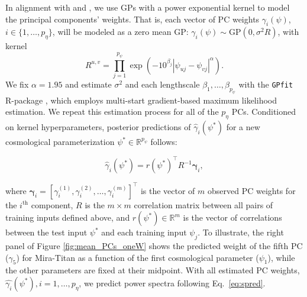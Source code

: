\documentclass[11pt]{article}
\begin{document}

In alignment with \cite{higdon2010estcosmo} and \cite{moran2023mira}, we use 
GPs with a power exponential kernel to model the principal components' weights. 
That is, each vector of PC weights $\gamma_i(\psi)$, $i \in \{1,\ldots,p_\eta\}$, 
will be modeled as a zero mean GP: $\gamma_i(\psi) \sim \mathrm{GP}(0, \sigma^2R)$, with kernel
\begin{equation*}
    R^{u,v} = \prod_{j=1}^{p_\psi}\exp\left(-10^{\beta_j}|\psi_{uj}-\psi_{vj}|^\alpha\right).
\end{equation*}
We fix $\alpha=1.95$ and estimate $\sigma^2$ and each lengthscale $\beta_1,\ldots,\beta_{p_\psi}$ 
with the \texttt{GPfit} {\sf R}-package \citep{macdonald2015gpfit}, which employs multi-start 
gradient-based maximum likelihood estimation.  We repeat this estimation
process for all of the $p_\eta$ PCs.  Conditioned on kernel hyperparameters,
posterior predictions of $\hat{\gamma}_i(\psi^*)$ for a new cosmological parameterization 
$\psi^* \in \mathbb{R}^{p_\psi}$ follows:

\begin{equation*}
\hat{\gamma}_i(\psi^*) = r(\psi^*)^\top R^{-1} \boldsymbol{\gamma}_i,
\end{equation*}

\noindent
where $\boldsymbol{\gamma}_i = [\gamma_i^{(1)}, \gamma_i^{(2)}, \ldots, \gamma_i^{(m)}]^\top$ 
is the vector of $m$ observed PC weights for the $i^\textrm{th}$ component, 
$R$ is the $m \times m$ correlation matrix between 
all pairs of training inputs defined above, and $r(\psi^*) \in \mathbb{R}^m$ is 
the vector of correlations between the test input $\psi^*$ and each training input 
$\psi_j$. To illustrate, the right panel of Figure \ref{fig:mean_PCs_oneW} shows
the predicted weight of the fifth PC ($\gamma_5$) for Mira-Titan as a function 
of the first cosmological parameter ($\psi_1$), while the other parameters are fixed 
at their midpoint.  With all estimated PC weights, $\hat{\gamma_i}(\psi^*), i=1,\ldots,p_\eta$, 
we predict power spectra following Eq.~\ref{eq:spred}.  
\end{document}
